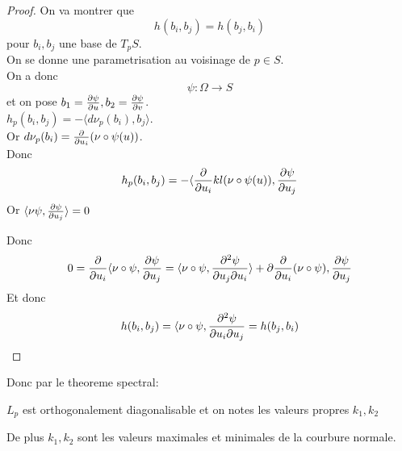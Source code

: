 \documentclass[../main.tex]{subfiles}
\begin{document}
\begin{proof}
On va montrer que 
\[ 
h( b_i, b_j) = h( b_j,b_i) 
\]
pour $b_i, b_j$ une base de $T_pS$.\\
On se donne une parametrisation au voisinage de $p\in S$.\\
On a donc
\[ 
\psi:\Omega\to S
\]
et on pose $b_1= \frac{\partial\psi}{\partial u}, b_2= \frac{\partial\psi}{\partial v}$.\\
$h_p( b_i, b_j) = - \langle d\nu_p( b_i) , b_j\rangle$.\\
Or $d\nu_p( b_i) = \frac{\partial}{\partial u_i}( \nu\circ\psi( u)  ) $.\\
Donc
\[ 
h_p( b_i, b_j) = - \langle \frac{\partial}{\partial u_i}kl( \nu\circ\psi( u) ), \frac{\partial\psi}{\partial u_j}
\]
Or $\langle\nu\psi, \frac{\partial\psi}{\partial u_j}\rangle =0$ 

Donc
\[ 
0 = \frac{\partial}{\partial u_i}\langle \nu\circ\psi, \frac{\partial\psi}{\partial u_j}= \langle\nu\circ\psi, \frac{\partial^{2}\psi}{\partial u_j\partial u_i}\rangle + \partial \frac{\partial}{\partial u_i}( \nu\circ\psi) , \frac{\partial\psi}{\partial u_j}
\]
Et donc
\[ 
h( b_i, b_j) = \langle \nu\circ\psi, \frac{\partial ^{2}\psi}{\partial u_i\partial u_j} = h( b_j, b_i) 
\]
\end{proof}
Donc par le theoreme spectral:
\begin{crly}
$L_p$ est orthogonalement diagonalisable et on notes les valeurs propres $k_1, k_2$ 
\end{crly}
De plus $k_1, k_2$ sont les valeurs maximales et minimales de la courbure normale.


	
\end{document}
